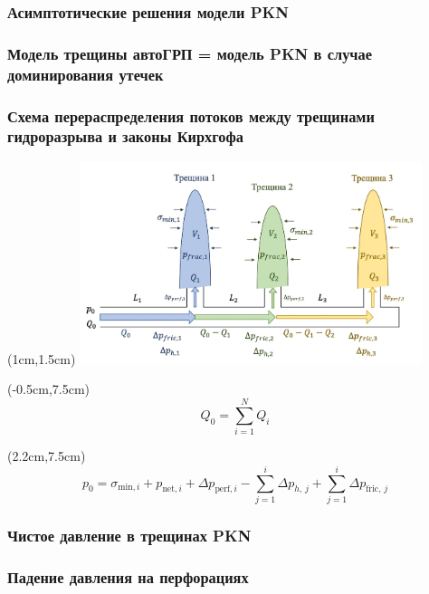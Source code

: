 \documentclass{beamer}
\begin{document}
\begin{frame}
\frametitle{Асимптотические решения модели PKN}

\end{frame}


\begin{frame}
\frametitle{Модель трещины автоГРП = модель PKN в случае доминирования утечек}

\end{frame}


\begin{frame}
\frametitle{Схема перераспределения потоков между трещинами гидроразрыва и законы Кирхгофа}

\begin{textblock*}{11cm}(1cm,1.5cm)
\includegraphics[width=10cm]{flow_distribution_scheme.jpg}
\end{textblock*}

\begin{textblock*}{4cm}(-0.5cm,7.5cm)
$$\boxed{Q_0=\sum\limits_{i=1}^{N}Q_i}$$
\end{textblock*}

\begin{textblock*}{11cm}(2.2cm,7.5cm)
$$\boxed{p_0=\sigma_{\text{min},i}+p_{\text{net},i}+\Delta p_{\text{perf},i}-\sum_{j=1}^{i}{\Delta p_{h,\,j}}+\sum_{j=1}^{i}\Delta p_{\text{fric},\,j}}$$
\end{textblock*}

\end{frame}


\begin{frame}
\frametitle{Чистое давление в трещинах PKN}

\end{frame}


\begin{frame}
\frametitle{Падение давления на перфорациях}

\end{frame}
\end{document}
